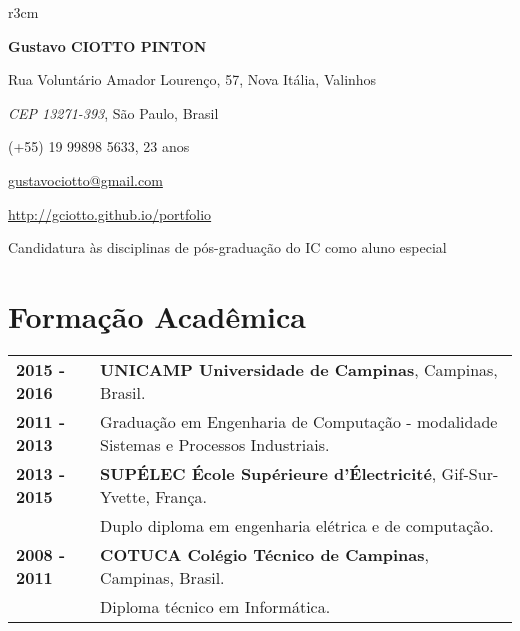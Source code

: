 \documentclass[10pt, a4paper]{article}
\author{Gustavo Ciotto Pinton}
\begin{document}
\pagestyle{empty}

\begin{wrapfigure}{r}{3cm}
\vspace{-20pt}
\begin{center}
\end{center}
\end{wrapfigure}

\textbf{\LARGE Gustavo CIOTTO PINTON}

Rua Voluntário Amador Lourenço, 57, Nova Itália, Valinhos

\textit{CEP 13271-393}, São Paulo, Brasil

(+55) 19 99898 5633, 23 anos

\url{gustavociotto@gmail.com}

\url{http://gciotto.github.io/portfolio}

\vspace{8pt}

{\centerline {\large Candidatura às disciplinas de pós-graduação do IC como
aluno especial }}



\section{Formação Acadêmica}

\begin{tabular}{p{} p{}}

\textbf{2015 - 2016} & \textbf{UNICAMP Universidade de Campinas}, Campinas,
Brasil.
\\
\textbf{2011 - 2013} & Graduação em Engenharia de Computação - modalidade
Sistemas e Processos Industriais. \vspace{8pt}\\

\textbf{2013 - 2015} & \textbf{SUPÉLEC  École Supérieure d'Électricité},
Gif-Sur-Yvette, França. \\
& Duplo diploma em  engenharia elétrica e de computação. \vspace{8pt} \\

\textbf{2008 - 2011} & \textbf{COTUCA Colégio Técnico de Campinas}, Campinas,
Brasil. \\
& Diploma técnico em Informática. \\
\end{tabular}
\end{document}
